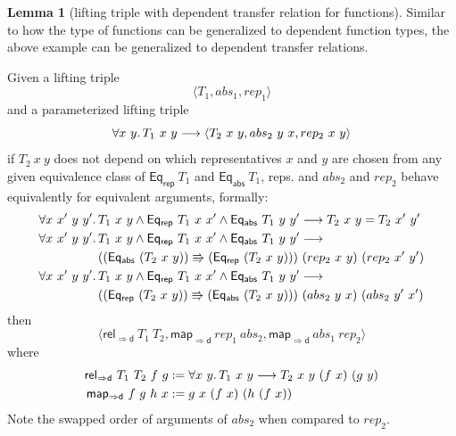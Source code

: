\documentclass[]{article}
\theoremstyle{definition}
\newtheorem{lemma}[theorem]{Lemma}
\newcommand{\eqrep}{\mathsf{Eq_{rep}}}
\newcommand{\eqabs}{\mathsf{Eq_{abs}}}
\newcommand{\mapfund}{\mathsf{map_{\Rightarrow d}}}
\newcommand{\relfund}{\mathsf{rel_{\Rightarrow d}}}
\begin{document}
\begin{lemma}[lifting triple with dependent transfer relation for functions]
	Similar to how the type of functions can be generalized to dependent function types, the above example can be generalized to dependent transfer relations.
	
	Given a lifting triple
	\begin{equation*}
		\langle T_1, abs_1, rep_1 \rangle
	\end{equation*}
	and a parameterized lifting triple
	\begin{equation*}
		\forall x\ y \ldotp T_1\ x\ y \longrightarrow \langle T_2\ x\ y, abs_2\ y\ x, rep_2\ x\ y\rangle
	\end{equation*}
	if \(T_2\ x\ y\) does not depend on which representatives \(x\) and \(y\) are chosen from any given equivalence class of \(\eqrep\ T_1\) and \(\eqabs\ T_1\), reps. and \(abs_2\) and \(rep_2\) behave equivalently for equivalent arguments, formally:
	\begin{align*}
		\forall x\ x'\ y\ y' \ldotp\, & T_1\ x\ y \land \eqrep\ T_1\ x\ x' \land \eqabs\ T_1\ y\ y' \longrightarrow T_2\ x\ y = T_2\ x'\ y' \\
		\forall x\ x'\ y\ y' \ldotp\, & T_1\ x\ y \land \eqrep\ T_1\ x\ x' \land \eqabs\ T_1\ y\ y' \longrightarrow \\
		& ((\eqabs\ (T_2\ x\ y)) \Rrightarrow (\eqrep\ (T_2\ x\ y)))\ (rep_2\ x\ y)\ (rep_2\ x'\ y') \\
		\forall x\ x'\ y\ y' \ldotp\, & T_1\ x\ y \land \eqrep\ T_1\ x\ x' \land \eqabs\ T_1\ y\ y' \longrightarrow \\
		& ((\eqrep\ (T_2\ x\ y)) \Rrightarrow (\eqabs\ (T_2\ x\ y)))\ (abs_2\ y\ x)\ (abs_2\ y'\ x')
	\end{align*}
	then
	\begin{equation*}
		\langle \relfund\ T_1\ T_2, \mapfund\ rep_1\ abs_2, \mapfund\ abs_1\ rep_2 \rangle
	\end{equation*}
	where
	\begin{align*}
		\relfund\ T_1\ T_2\ f\ g &:= \forall x\ y\ldotp T_1\ x\ y \longrightarrow T_2\ x\ y\ (f\ x)\ (g\ y) \\
		\mapfund\ f\ g\ h\ x &:= g\ x\ (f\ x)\ (h\ (f\ x))
	\end{align*}
	Note the swapped order of arguments of \(abs_2\) when compared to \(rep_2\).
	

\end{lemma}
\end{document}
